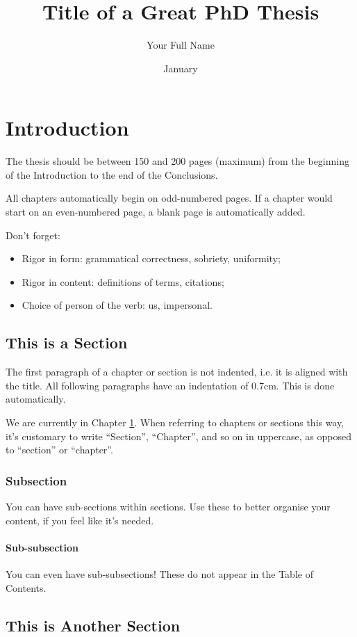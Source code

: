 \documentclass{thesis}
\title{Title of a Great PhD Thesis}
\author{Your Full Name}
\date{January}{2026}
\begin{document}
\chapter{Introduction}\label{ch:introduction}
The thesis should be between 150 and 200 pages (maximum) from the beginning of the Introduction to the end of the Conclusions.

All chapters automatically begin on odd-numbered pages. If a chapter would start on an even-numbered page, a blank page is automatically added.

Don't forget:
\begin{itemize}
    \item Rigor in form: grammatical correctness, sobriety, uniformity;
    \item Rigor in content: definitions of terms, citations;
    \item Choice of person of the verb: us, impersonal.
\end{itemize}


\section{This is a Section}\label{sec:example_section}
The first paragraph of a chapter or section is not indented, i.e. it is aligned with the title. All following paragraphs have an indentation of 0.7cm. This is done automatically.

We are currently in Chapter \ref{ch:introduction}. When referring to chapters or sections this way, it's customary to write ``Section'', ``Chapter'', and so on in uppercase, as opposed to ``section'' or ``chapter''.

\subsection{Subsection}
You can have sub-sections within sections. Use these to better organise your content, if you feel like it's needed.

\subsubsection{Sub-subsection}
You can even have sub-subsections! These do not appear in the Table of Contents.

\section{This is Another Section}
\end{document}
